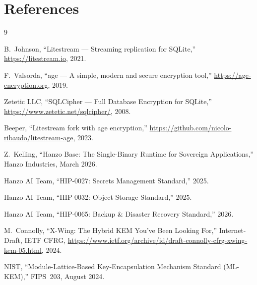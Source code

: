 \section{References}


\begin{thebibliography}{9}

B.~Johnson, ``Litestream --- Streaming replication for SQLite,''
\url{https://litestream.io}, 2021.

F.~Valsorda, ``age --- A simple, modern and secure encryption tool,''
\url{https://age-encryption.org}, 2019.

Zetetic LLC, ``SQLCipher --- Full Database Encryption for SQLite,''
\url{https://www.zetetic.net/sqlcipher/}, 2008.

Beeper, ``Litestream fork with age encryption,''
\url{https://github.com/nicolo-ribaudo/litestream-age}, 2023.

Z.~Kelling, ``Hanzo Base: The Single-Binary Runtime for Sovereign
Applications,'' Hanzo Industries, March 2026.

Hanzo AI Team, ``HIP-0027: Secrets Management Standard,'' 2025.

Hanzo AI Team, ``HIP-0032: Object Storage Standard,'' 2025.

Hanzo AI Team, ``HIP-0065: Backup \& Disaster Recovery Standard,'' 2026.

M.~Connolly, ``X-Wing: The Hybrid KEM You've Been Looking For,''
Internet-Draft, IETF CFRG,
\url{https://www.ietf.org/archive/id/draft-connolly-cfrg-xwing-kem-05.html},
2024.

NIST, ``Module-Lattice-Based Key-Encapsulation Mechanism Standard
(ML-KEM),'' FIPS~203, August 2024.

\end{thebibliography}

